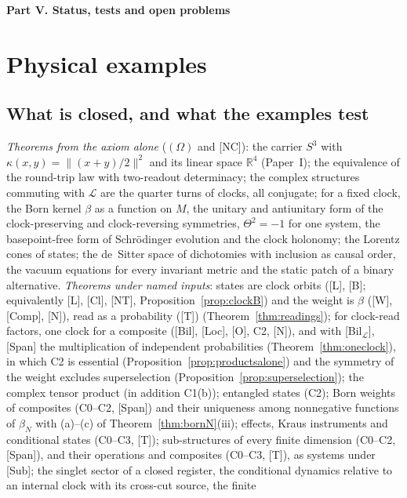 \documentclass[aps,pra,onecolumn,superscriptaddress,nofootinbib,10pt]{revtex4-2}
\theoremstyle{definition}
\theoremstyle{remark}
\newcommand{\R}{\mathbb{R}}
\newcommand{\cL}{\mathcal{L}}
\newcommand{\paperpart}[1]{\par\bigskip\begin{center}\large\bfseries #1\end{center}\par\medskip}
\begin{document}
\paperpart{Part V.  Status, tests and open problems}

\section{Physical examples}\label{sec:examples}

\subsection{What is closed, and what the examples test}\label{sec:closed}
\emph{Theorems from the axiom alone} ($(\Omega)$ and [NC]): the carrier $S^3$ with $\kappa(x,y)=\lVert(x+y)/2\rVert^2$
and its linear space $\R^4$ (Paper~I); the equivalence of the round-trip law with two-readout
determinacy; the complex structures commuting with $\cL$ are the quarter turns of clocks, all conjugate;
for a fixed clock, the Born kernel $\beta$ as a function on $M$, the unitary and antiunitary form of the
clock-preserving and clock-reversing symmetries, $\Theta^2=-1$ for one system, the basepoint-free form of
Schr\"odinger evolution and the clock holonomy; the Lorentz cones of states; the de~Sitter space of
dichotomies with inclusion as causal order, the vacuum equations for every invariant metric and the
static patch of a binary alternative.
\emph{Theorems under named inputs}: states are clock orbits ([L], [B]; equivalently [L], [Cl], [NT],
Proposition~\ref{prop:clockB}) and the weight is
$\beta$ ([W], [Comp], [N]), read as a probability ([T]) (Theorem~\ref{thm:readings}); for clock-read factors, one clock for
a composite ([Bil], [Loc], [O], C2, [N]), and with [Bil$_\cL$], [Span] the multiplication of independent
probabilities (Theorem~\ref{thm:oneclock}), in which C2 is essential (Proposition~\ref{prop:productsalone}) and the
symmetry of the weight excludes superselection (Proposition~\ref{prop:superselection}); the complex tensor
product (in addition C1(b)); entangled states (C2); Born weights of composites (C0--C2, [Span]) and their
uniqueness among nonnegative functions of $\beta_N$ with (a)--(c) of Theorem~\ref{thm:bornN}(iii); effects, Kraus
instruments and conditional states (C0--C3, [T]); sub-structures of every finite dimension (C0--C2, [Span]),
and their operations and composites (C0--C3, [T]), as systems under [Sub]; the singlet sector of a closed
register, the conditional dynamics relative to an internal clock with its cross-cut source, the finite
\end{document}
